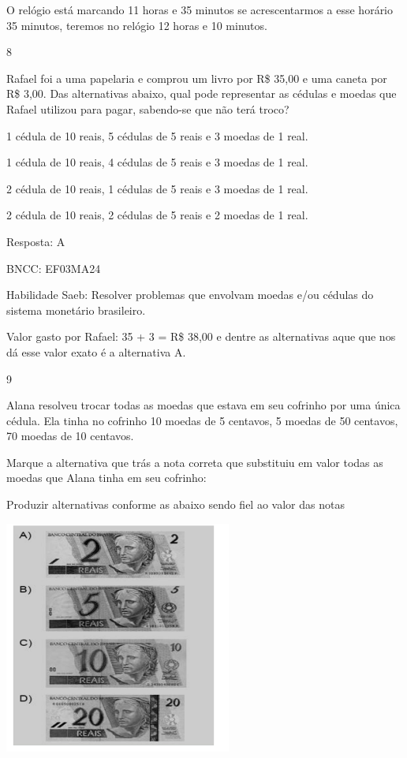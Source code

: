 \begin{escolha}
{\begin{escolha}
{O relógio está marcando 11 horas e 35 minutos se acrescentarmos a esse
horário 35 minutos, teremos no relógio 12 horas e 10 minutos.

\num{8}

Rafael foi a uma papelaria e comprou um livro por R\$ 35,00 e uma caneta
por R\$ 3,00. Das alternativas abaixo, qual pode representar as cédulas
e moedas que Rafael utilizou para pagar, sabendo-se que não terá troco?

\begin{escolha}

\item
  1 cédula de 10 reais, 5 cédulas de 5 reais e 3 moedas de 1 real.
\item
  1 cédula de 10 reais, 4 cédulas de 5 reais e 3 moedas de 1 real.
\item
  2 cédula de 10 reais, 1 cédulas de 5 reais e 3 moedas de 1 real.
\item
  2 cédula de 10 reais, 2 cédulas de 5 reais e 2 moedas de 1 real.
\end{escolha}

Resposta: A

BNCC: EF03MA24

Habilidade Saeb: Resolver problemas que envolvam moedas e/ou cédulas do
sistema monetário brasileiro.

Valor gasto por Rafael: 35 + 3 = R\$ 38,00 e dentre as alternativas aque
que nos dá esse valor exato é a alternativa A.

\num{9}

Alana resolveu trocar todas as moedas que estava em seu cofrinho por uma
única cédula. Ela tinha no cofrinho 10 moedas de 5 centavos, 5 moedas de
50 centavos, 70 moedas de 10 centavos.

Marque a alternativa que trás a nota correta que substituiu em valor
todas as moedas que Alana tinha em seu cofrinho:

Produzir alternativas conforme as abaixo sendo fiel ao valor das notas

\includegraphics[width=2.93590in,height=3.00930in]{media/image135.png}

}
\end{escolha}}
\end{escolha}
